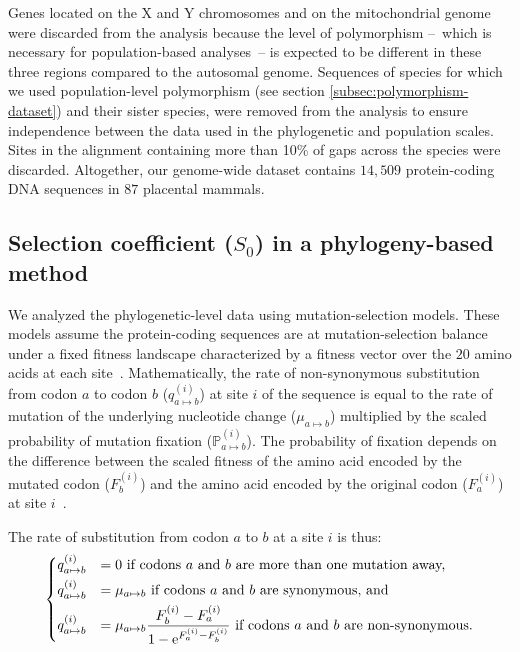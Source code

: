 \documentclass{article}
\newcommand{\e}{\text{e}}
\newcommand{\proba}{\mathbb{P}}
\newcommand{\Sphy}{S_{0}}
\begin{document}
    Genes located on the X and Y chromosomes and on the mitochondrial genome were discarded from the analysis because the level of polymorphism –~which is necessary for population-based analyses~– is expected to be different in these three regions compared to the autosomal genome.
    Sequences of species for which we used population-level polymorphism (see section \ref{subsec:polymorphism-dataset}) and their sister species, were removed from the analysis to ensure independence between the data used in the phylogenetic and population scales.
    Sites in the alignment containing more than 10\% of gaps across the species were discarded.
    Altogether, our genome-wide dataset contains $14,509$ protein-coding DNA sequences in $87$ placental mammals.

    \subsection{Selection coefficient ($\Sphy$) in a phylogeny-based method}
    \label{subsec:s-phylogeny-method}

    We analyzed the phylogenetic-level data using mutation-selection models.
    These models assume the protein-coding sequences are at mutation-selection balance under a fixed fitness landscape characterized by a fitness vector over the $20$ amino acids at each site~\cite{yang_mutationselection_2008, halpern_evolutionary_1998, rodrigue_mechanistic_2010}.
    Mathematically, the rate of non-synonymous substitution from codon $a$ to codon $b$ ($q_{a \mapsto b}^{(i)}$) at site $i$ of the sequence is equal to the rate of mutation of the underlying nucleotide change ($\mu_{a \mapsto b}$) multiplied by the scaled probability of mutation fixation ($\proba_{a \mapsto b}^{(i)}$).
    The probability of fixation depends on the difference between the scaled fitness of the amino acid encoded by the mutated codon ($F_b^{(i)}$) and the amino acid encoded by the original codon ($F_a^{(i)}$) at site $i$~\cite{wright_evolution_1931, fisher_genetical_1930}.

    The rate of substitution from codon $a$ to $b$ at a site $i$ is thus:
    \begin{equation}
        \begin{dcases}
            q_{a \mapsto b}^{(i)} & = 0 \text{ if codons $a$ and $b$ are more than one mutation away,} \\
            q_{a \mapsto b}^{(i)} & = \mu_{a \mapsto b} \text{ if codons $a$ and $b$ are synonymous, and}\\
            q_{a \mapsto b}^{(i)} & = \mu_{a \mapsto b} \dfrac{F_b^{(i)} - F_a^{(i)}}{1 - \e^{F_a^{(i)} - F_b^{(i)}}} \text{ if codons $a$ and $b$ are non-synonymous}.
        \end{dcases}
    \end{equation}
\end{document}

